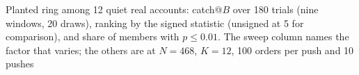 \begin{table}[t]
\centering\scriptsize
\setlength{\tabcolsep}{3pt}
\caption{Planted ring among 12 quiet real accounts: catch@$B$ over 180 trials (nine windows, 20 draws), ranking by the signed statistic (unsigned at 5 for comparison), and share of members with $p\le0.01$. The sweep column names the factor that varies; the others are at $N=468$, $K=12$, 100 orders per push and 10 pushes}\label{tab:realplant}
\end{table}



